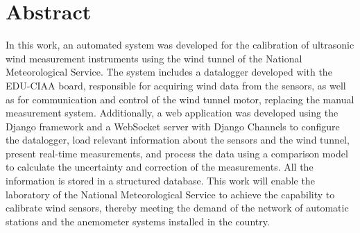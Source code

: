 \chapter*{Abstract}
In this work, an automated system was developed for the calibration of ultrasonic wind measurement instruments using the wind tunnel of the National Meteorological Service. The system includes a datalogger developed with the EDU-CIAA board, responsible for acquiring wind data from the sensors, as well as for communication and control of the wind tunnel motor, replacing the manual measurement system. Additionally, a web application was developed using the Django framework and a WebSocket server with Django Channels to configure the datalogger, load relevant information about the sensors and the wind tunnel, present real-time measurements, and process the data using a comparison model to calculate the uncertainty and correction of the measurements. All the information is stored in a structured database. This work will enable the laboratory of the National Meteorological Service to achieve the capability to calibrate wind sensors, thereby meeting the demand of the network of automatic stations and the anemometer systems installed in the country.